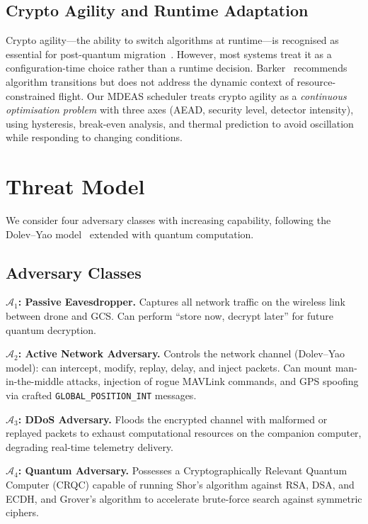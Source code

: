\documentclass[conference]{IEEEtran}
\begin{document}
\subsection{Crypto Agility and Runtime Adaptation}

Crypto agility---the ability to switch algorithms at runtime---is recognised as essential for post-quantum migration~\cite{nist-round4}.
However, most systems treat it as a configuration-time choice rather than a runtime decision.
Barker~\cite{nist-sp800-131a} recommends algorithm transitions but does not address the dynamic context of resource-constrained flight.
Our MDEAS scheduler treats crypto agility as a \emph{continuous optimisation problem} with three axes (AEAD, security level, detector intensity), using hysteresis, break-even analysis, and thermal prediction to avoid oscillation while responding to changing conditions.

\section{Threat Model}
\label{sec:threat}

We consider four adversary classes with increasing capability, following the Dolev--Yao model~\cite{dolev1983security} extended with quantum computation.

\subsection{Adversary Classes}

\textbf{$\mathcal{A}_1$: Passive Eavesdropper.}
Captures all network traffic on the wireless link between drone and GCS.
Can perform ``store now, decrypt later'' for future quantum decryption.

\textbf{$\mathcal{A}_2$: Active Network Adversary.}
Controls the network channel (Dolev--Yao model): can intercept, modify, replay, delay, and inject packets.
Can mount man-in-the-middle attacks, injection of rogue MAVLink commands, and GPS spoofing via crafted \texttt{GLOBAL\_POSITION\_INT} messages.

\textbf{$\mathcal{A}_3$: DDoS Adversary.}
Floods the encrypted channel with malformed or replayed packets to exhaust computational resources on the companion computer, degrading real-time telemetry delivery.

\textbf{$\mathcal{A}_4$: Quantum Adversary.}
Possesses a Cryptographically Relevant Quantum Computer (CRQC) capable of running Shor's algorithm against RSA, DSA, and ECDH, and Grover's algorithm to accelerate brute-force search against symmetric ciphers.
\end{document}
